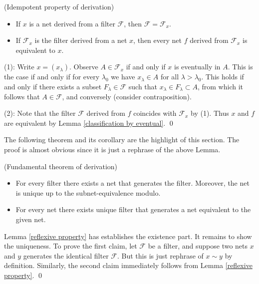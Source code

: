 \documentclass{report}
\begin{document}
\begin{lem}\label{reflexive property} (Idempotent property of derivation)
    \begin{itemize}
        \item[(1)] If \( x \) is a net derived from a filter \( \mathscr{F} \), then \( \mathscr{F} = \mathscr{F}_x \).
        \item[(2)] If \( \mathscr{F}_x \) is the filter derived from a net \( x \),
            then every net \( f \) derived from \( \mathscr{F}_x \) is equivalent to \( x \).
    \end{itemize}
\end{lem}
\begin{prf}
    (1): Write \( x = (x_{\lambda}) \). Observe \( A \in \mathscr{F}_x \) if and only if \( x \) is eventually in \( A \).
    This is the case if and only if for every \( \lambda_0 \) we have \( x_{\lambda} \in A \) for all \( \lambda > \lambda_0 \).
    This holds if and only if there exists a subset \( F_{\lambda}\in \mathscr{F} \) such that \( x_{\lambda} \in F_{\lambda} \subset A \), from which it follows that \( A \in \mathscr{F} \), and conversely (consider contraposition).

    (2): Note that the filter \( \mathscr{F} \) derived from \( f \) coincides with \( \mathscr{F}_x \) by (1). Thus \( x \) and \( f \) are equivalent by Lemma \ref{classification by eventual}.
    \qed\end{prf}

The following theorem and its corollary are the highlight of this section. The proof is almost obvious since it is just a rephrase of the above Lemma.
\begin{thm}\label{fundamental theorem of derivation} (Fundamental theorem of derivation)
    \begin{itemize}
        \item[(1)] For every filter there exists a net that generates the filter. Moreover, the net is unique up to the subnet-equivalence modulo.
        \item[(2)] For every net there exists unique filter that generates a net equivalent to the given net.
    \end{itemize}
\end{thm}
\begin{prf}
    Lemma \ref{reflexive property} has establishes the existence part. It remains to show the uniqueness.
    To prove the first claim, let \( \mathscr{F} \) be a filter, and suppose two nets \( x \) and \( y \) generates the identical filter \( \mathscr{F} \). But this is just rephrase of \( x \sim y \) by definition.
    Similarly, the second claim immediately follows from Lemma \ref{reflexive property}.
    \qed\end{prf}
\end{document}
